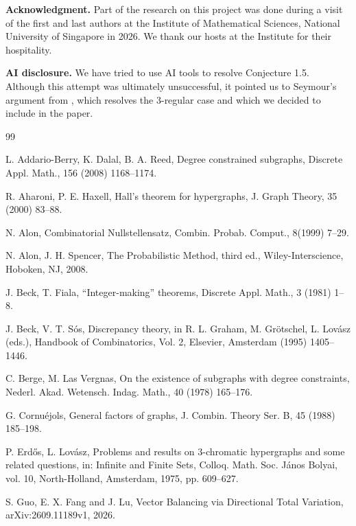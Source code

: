\documentclass[11pt, a4paper]{article}
\numberwithin{theorem}{section} %
\theoremstyle{remark}
\theoremstyle{definition}
\begin{document}
\noindent
{\bf Acknowledgment.}
Part of the research on this project was done during a visit of the first and last authors at the Institute of Mathematical Sciences, National University of Singapore in 2026. We thank our hosts at the Institute for their hospitality.  

\medskip
\noindent
{\bf AI disclosure.} 
We have tried to use AI tools to resolve Conjecture 1.5. Although this attempt was ultimately unsuccessful, it pointed us to Seymour's argument from \cite{Seymour74}, which resolves the 3-regular case and which we decided to include in the paper.

\begin{thebibliography}{99}

L. Addario-Berry, K. Dalal, B. A. Reed,
Degree constrained subgraphs, Discrete Appl. Math., 156 (2008) 1168--1174.

R. Aharoni, P. E. Haxell,
Hall's theorem for hypergraphs, J. Graph Theory, 35 (2000) 83--88.

N. Alon,
Combinatorial Nullstellensatz, Combin. Probab. Comput., 8(1999) 7--29.

N. Alon, J. H. Spencer,
The Probabilistic Method, third ed., Wiley-Interscience, Hoboken, NJ, 2008.

J. Beck, T. Fiala,
{``Integer-making''} theorems, Discrete Appl. Math., 3 (1981) 1--8.

J. Beck, V. T. S\'os,
Discrepancy theory, in R. L. Graham, M. Gr\"otschel, L. Lov\'asz (eds.),
Handbook of Combinatorics, Vol. 2, Elsevier, Amsterdam (1995) 1405--1446.

C. Berge, M. Las Vergnas,
On the existence of subgraphs with degree constraints, Nederl. Akad. Wetensch. Indag. Math., 40 (1978) 165--176.

G. Cornu{\'e}jols,
General factors of graphs, J. Combin. Theory Ser. B, 45 (1988) 185--198.

P. Erd{\H{o}}s, L. Lov{\'a}sz,
Problems and results on $3$-chromatic hypergraphs and some related questions, in: Infinite and Finite Sets, Colloq. Math. Soc. J{\'a}nos Bolyai, vol. 10, North-Holland, Amsterdam, 1975, pp. 609--627.

S. Guo, E. X. Fang and J. Lu,
Vector Balancing via Directional Total Variation,
arXiv:2609.11189v1, 2026.


\end{thebibliography}
\end{document}
